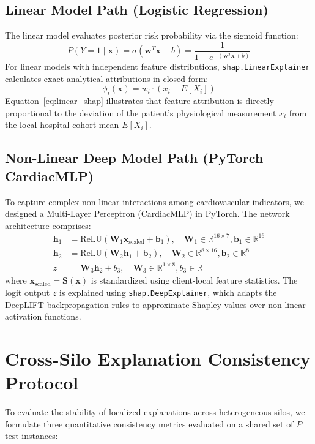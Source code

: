 \documentclass[12pt,a4paper,oneside]{report}
\begin{document}
\subsection{Linear Model Path (Logistic Regression)}
The linear model evaluates posterior risk probability via the sigmoid function:
\begin{equation}
    P(Y=1 \mid \mathbf{x}) = \sigma(\mathbf{w}^T \mathbf{x} + b) = \frac{1}{1 + e^{-(\mathbf{w}^T \mathbf{x} + b)}}
\end{equation}
For linear models with independent feature distributions, \texttt{shap.LinearExplainer} calculates exact analytical attributions in closed form:
\begin{equation}
    \phi_i(\mathbf{x}) = w_i \cdot \left( x_i - E[X_i] \right)
    \label{eq:linear_shap}
\end{equation}
Equation~\eqref{eq:linear_shap} illustrates that feature attribution is directly proportional to the deviation of the patient's physiological measurement $x_i$ from the local hospital cohort mean $E[X_i]$.

\subsection{Non-Linear Deep Model Path (PyTorch CardiacMLP)}
To capture complex non-linear interactions among cardiovascular indicators, we designed a Multi-Layer Perceptron (CardiacMLP) in PyTorch. The network architecture comprises:
\begin{align}
    \mathbf{h}_1 &= \text{ReLU}(\mathbf{W}_1 \mathbf{x}_{\text{scaled}} + \mathbf{b}_1), \quad \mathbf{W}_1 \in \mathbb{R}^{16 \times 7}, \mathbf{b}_1 \in \mathbb{R}^{16} \\
    \mathbf{h}_2 &= \text{ReLU}(\mathbf{W}_2 \mathbf{h}_1 + \mathbf{b}_2), \quad \mathbf{W}_2 \in \mathbb{R}^{8 \times 16}, \mathbf{b}_2 \in \mathbb{R}^{8} \\
    z &= \mathbf{W}_3 \mathbf{h}_2 + b_3, \quad \mathbf{W}_3 \in \mathbb{R}^{1 \times 8}, b_3 \in \mathbb{R}
\end{align}
where $\mathbf{x}_{\text{scaled}} = \mathbf{S}(\mathbf{x})$ is standardized using client-local feature statistics. The logit output $z$ is explained using \texttt{shap.DeepExplainer}, which adapts the DeepLIFT backpropagation rules to approximate Shapley values over non-linear activation functions.

\section{Cross-Silo Explanation Consistency Protocol}
To evaluate the stability of localized explanations across heterogeneous silos, we formulate three quantitative consistency metrics evaluated on a shared set of $P$ test instances:
\end{document}
